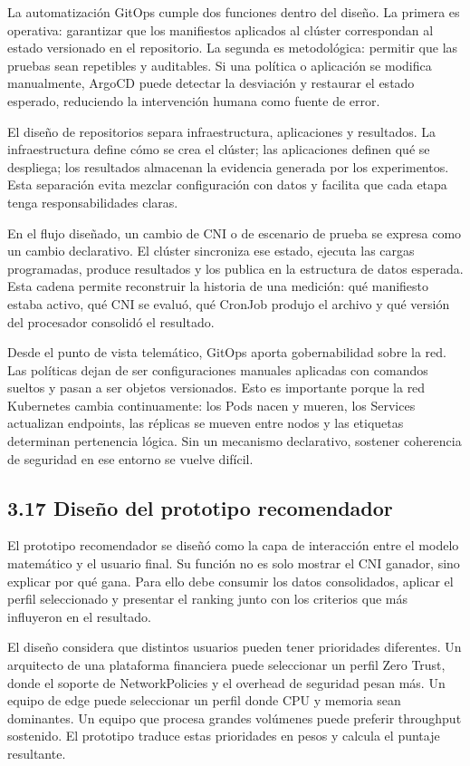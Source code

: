 \documentclass[journal]{IEEEtran}
\begin{document}
La automatización GitOps cumple dos funciones dentro del diseño. La primera es operativa: garantizar que los manifiestos aplicados al clúster correspondan al estado versionado en el repositorio. La segunda es metodológica: permitir que las pruebas sean repetibles y auditables. Si una política o aplicación se modifica manualmente, ArgoCD puede detectar la desviación y restaurar el estado esperado, reduciendo la intervención humana como fuente de error.

El diseño de repositorios separa infraestructura, aplicaciones y resultados. La infraestructura define cómo se crea el clúster; las aplicaciones definen qué se despliega; los resultados almacenan la evidencia generada por los experimentos. Esta separación evita mezclar configuración con datos y facilita que cada etapa tenga responsabilidades claras.

En el flujo diseñado, un cambio de CNI o de escenario de prueba se expresa como un cambio declarativo. El clúster sincroniza ese estado, ejecuta las cargas programadas, produce resultados y los publica en la estructura de datos esperada. Esta cadena permite reconstruir la historia de una medición: qué manifiesto estaba activo, qué CNI se evaluó, qué CronJob produjo el archivo y qué versión del procesador consolidó el resultado.

Desde el punto de vista telemático, GitOps aporta gobernabilidad sobre la red. Las políticas dejan de ser configuraciones manuales aplicadas con comandos sueltos y pasan a ser objetos versionados. Esto es importante porque la red Kubernetes cambia continuamente: los Pods nacen y mueren, los Services actualizan endpoints, las réplicas se mueven entre nodos y las etiquetas determinan pertenencia lógica. Sin un mecanismo declarativo, sostener coherencia de seguridad en ese entorno se vuelve difícil.

\subsection{3.17 Diseño del prototipo recomendador}

El prototipo recomendador se diseñó como la capa de interacción entre el modelo matemático y el usuario final. Su función no es solo mostrar el CNI ganador, sino explicar por qué gana. Para ello debe consumir los datos consolidados, aplicar el perfil seleccionado y presentar el ranking junto con los criterios que más influyeron en el resultado.

El diseño considera que distintos usuarios pueden tener prioridades diferentes. Un arquitecto de una plataforma financiera puede seleccionar un perfil Zero Trust, donde el soporte de NetworkPolicies y el overhead de seguridad pesan más. Un equipo de edge puede seleccionar un perfil donde CPU y memoria sean dominantes. Un equipo que procesa grandes volúmenes puede preferir throughput sostenido. El prototipo traduce estas prioridades en pesos y calcula el puntaje resultante.
\end{document}

